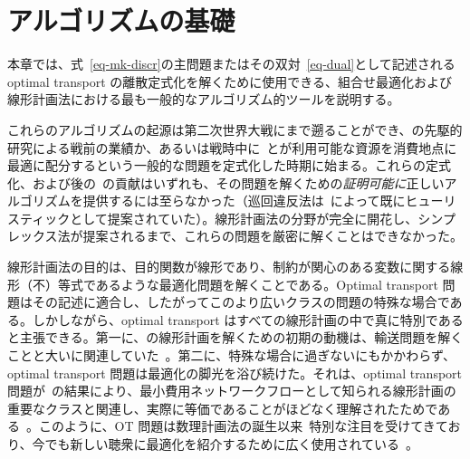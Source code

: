 \chapter{アルゴリズムの基礎}
\label{c-algo-basics}

本章では、式~\eqref{eq-mk-discr}の主問題またはその双対~\eqref{eq-dual}として記述される optimal transport の離散定式化を解くために使用できる、組合せ最適化および線形計画法における最も一般的なアルゴリズム的ツールを説明する。

これらのアルゴリズムの起源は第二次世界大戦にまで遡ることができ、\citeauthor{tolstoi1930methods}の先駆的研究\citeyearpar{tolstoi1930methods}による戦前の業績か、あるいは戦時中に~\citet{Hitchcock41}と\citet{Kantorovich42}が利用可能な資源を消費地点に最適に配分するという一般的な問題を定式化した時期に始まる。これらの定式化、および後の~\citet{koopmans1949optimum}の貢献はいずれも、その問題を解くための\emph{証明可能に}正しいアルゴリズムを提供するには至らなかった（巡回違反法は~\citet{tolstoi1939metody}によって既にヒューリスティックとして提案されていた）。線形計画法の分野が完全に開花し、シンプレックス法が提案されるまで、これらの問題を厳密に解くことはできなかった。

線形計画法の目的は、目的関数が線形であり、制約が関心のある変数に関する線形（不）等式であるような最適化問題を解くことである。Optimal transport 問題はその記述に適合し、したがってこのより広いクラスの問題の特殊な場合である。しかしながら、optimal transport はすべての線形計画の中で真に特別であると主張できる。第一に、\citeauthor{dantzig1991}の線形計画を解くための初期の動機は、輸送問題を解くことと大いに関連していた~\citep[p. 210]{dantzig49econometrica}。第二に、特殊な場合に過ぎないにもかかわらず、optimal transport 問題は最適化の脚光を浴び続けた。それは、optimal transport 問題が~\citet{ford1962flows}の結果により、最小費用ネットワークフローとして知られる線形計画の重要なクラスと関連し、実際に等価であることがほどなく理解されたためである~\citep[p. 213, Lem. 9.3]{korte2012combinatorial}。このように、OT 問題は数理計画法の誕生以来~\citep{Dantzig51}特別な注目を受けてきており、今でも新しい聴衆に最適化を紹介するために広く使用されている~\citep[\S1, p. 4]{nocedal}。

